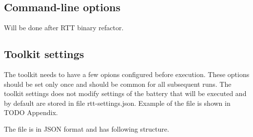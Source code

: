 \documentclass[
  digital,  	%
  color,		%
  oneside,   	%
  12pt,
  nocover,
  notable,
  nolof,
  nolot,
]{fithesis3}
\begin{document}
\subsection{Command-line options}
Will be done after RTT binary refactor.

\subsection{Toolkit settings}
The toolkit needs to have a few opions configured before execution. These options should be set only once and should be common for all subsequent runs. The toolkit settings does not modify settings of the battery that will be executed and by default are stored in file rtt-settings.json. Example of the file is shown in TODO Appendix.

The file is in JSON format and has following structure.
\end{document}
